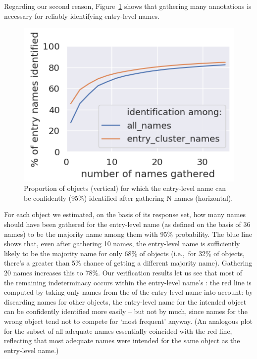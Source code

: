 Regarding our second reason, Figure~\ref{fig:entry-level-name-stability} shows that gathering many annotations is necessary for reliably identifying entry-level names.
\begin{figure}[t]
	\includegraphics[width=.9\columnwidth]{images/stability_analytic.png}
	\caption{Proportion of objects (vertical) for which the entry-level name can be confidently (95\%) identified after gathering N names (horizontal). }
	\label{fig:entry-level-name-stability}
\end{figure}
For each object we estimated, on the basis of its \mn response set, how many names should have been gathered for the entry-level name (as defined on the basis of 36 names) to be the majority name among them with 95\% probability.
The blue line shows that, even after gathering 10 names, the entry-level name is sufficiently likely to be the majority name for only 68\% of objects (i.e.,~for 32\% of objects, there's a greater than 5\% chance of getting a different majority name).
Gathering 20 names increases this to 78\%.
Our verification results let us see that most of the remaining indeterminacy occurs within the entry-level name's \cluster:
the red line is computed by taking only names from the \cluster of the entry-level name into account:
by discarding names for other objects, the entry-level name for the intended object can be confidently identified more easily -- but not by much, since names for the wrong object tend not to compete for `most frequent' anyway.
(An analogous plot for the subset of all adequate names essentially coincided with the red line, reflecting that most adequate names were intended for the same object as the entry-level name.)

